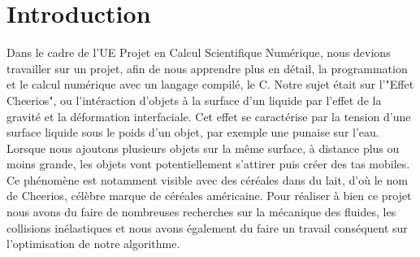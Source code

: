 \documentclass[a4paper, 11pt, oneside]{article} %
\begin{document}
 
\tableofcontents
\listoffigures
\listoftables
\section*{Introduction}

    Dans le cadre de l'UE Projet en Calcul Scientifique Numérique, nous devions travailler sur un projet, afin de nous apprendre plus en détail, la programmation et le calcul numérique avec un langage compilé, le C. Notre sujet était sur l'"Effet Cheerios", ou l’intéraction d'objets à la surface d'un liquide par l'effet de la gravité et la déformation interfaciale. Cet effet se caractérise par la tension d'une surface liquide sous le poids d'un objet, par exemple une punaise sur l'eau. Lorsque nous ajoutons plusieurs objets sur la même surface, à distance plus ou moins grande, les objets vont potentiellement s'attirer puis créer des tas mobiles. Ce phénomène est notamment visible avec des céréales dans du lait, d'où le nom de Cheerios, célèbre marque de céréales américaine. Pour réaliser à bien ce projet nous avons du faire de nombreuses recherches sur la mécanique des fluides, les collisions inélastiques et nous avons également du faire un travail conséquent sur l'optimisation de notre algorithme.
\end{document}
